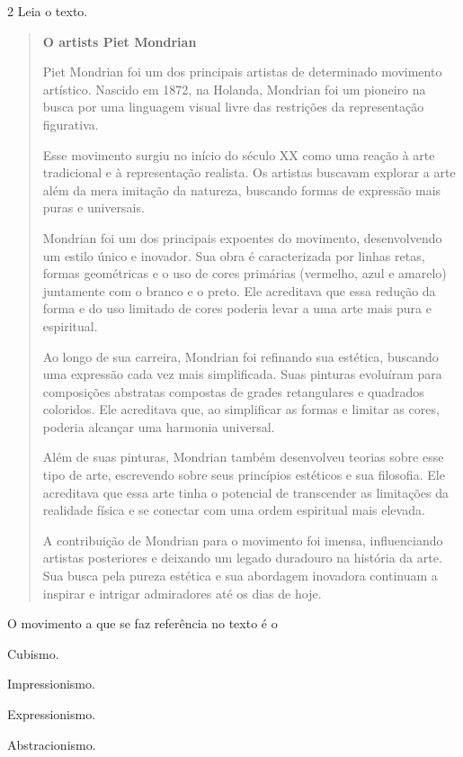 \num{2} Leia o texto.

\begin{quote}
\textbf{O artists Piet Mondrian}

Piet Mondrian foi um dos principais artistas de determinado movimento artístico. Nascido em 1872, na 
Holanda, Mondrian foi um pioneiro na busca por uma linguagem visual livre das restrições da representação 
figurativa.

Esse movimento surgiu no início do século XX como uma reação à arte tradicional e à representação realista. 
Os artistas buscavam explorar a arte além da mera imitação da natureza, buscando formas de expressão mais 
puras e universais.

Mondrian foi um dos principais expoentes do movimento, desenvolvendo um estilo único e inovador. Sua obra é 
caracterizada por linhas retas, formas geométricas e o uso de cores primárias (vermelho, azul e amarelo) 
juntamente com o branco e o preto. Ele acreditava que essa redução da forma e do uso limitado de cores 
poderia levar a uma arte mais pura e espiritual.

Ao longo de sua carreira, Mondrian foi refinando sua estética, buscando uma expressão cada vez mais 
simplificada. Suas pinturas evoluíram para composições abstratas compostas de grades retangulares e 
quadrados coloridos. Ele acreditava que, ao simplificar as formas e limitar as cores, poderia alcançar uma 
harmonia universal.

Além de suas pinturas, Mondrian também desenvolveu teorias sobre esse tipo de arte, escrevendo sobre seus 
princípios estéticos e sua filosofia. Ele acreditava que essa arte tinha o potencial de transcender as 
limitações da realidade física e se conectar com uma ordem espiritual mais elevada.

A contribuição de Mondrian para o movimento foi imensa, influenciando artistas posteriores e deixando um legado duradouro na história da arte. Sua busca pela pureza estética e sua abordagem inovadora continuam a inspirar e intrigar admiradores até os dias de hoje.

\end{quote}

O movimento a que se faz referência no texto é o

\begin{escolha}
\def\labelenumi{\alph{enumi})}
\item
  Cubismo.
  \item
  Impressionismo.
\item
  Expressionismo.
\item
  Abstracionismo.
\end{escolha}


